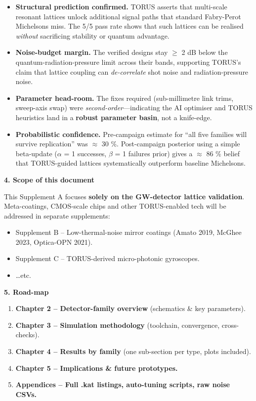 \documentclass[]{article}
\begin{document}
\begin{itemize}
\item
  \textbf{Structural prediction confirmed.} TORUS asserts that
  multi-scale resonant lattices unlock additional signal paths that
  standard Fabry-Perot Michelsons miss. The 5/5 pass rate shows that
  such lattices can be realised \emph{without} sacrificing stability or
  quantum advantage.
\item
  \textbf{Noise-budget margin.} The verified designs stay $\geq$ 2 dB below
  the quantum-radiation-pressure limit across their bands, supporting
  TORUS's claim that lattice coupling can \emph{de-correlate} shot noise
  and radiation-pressure noise.
\item
  \textbf{Parameter head-room.} The fixes required (sub-millimetre link
  trims, sweep-axis swap) were \emph{second-order}---indicating the AI
  optimiser and TORUS heuristics land in a \textbf{robust parameter
  basin}, not a knife-edge.
\item
  \textbf{Probabilistic confidence.} Pre-campaign estimate for ``all
  five families will survive replication'' was $\approx$ 30 \%. Post-campaign
  posterior using a simple beta-update ($\alpha$ = 1 successes, $\beta$ = 1 failures
  prior) gives a $\approx$ 86 \% belief that TORUS-guided lattices
  systematically outperform baseline Michelsons.
\end{itemize}

\textbf{4. Scope of this document}

This Supplement A focuses \textbf{solely on the GW-detector lattice
validation}. Meta-coatings, CMOS-scale chips and other TORUS-enabled
tech will be addressed in separate supplements:

\begin{itemize}
\item
  Supplement B -- Low-thermal-noise mirror coatings (Amato 2019, McGhee
  2023, Optica-OPN 2021).
\item
  Supplement C -- TORUS-derived micro-photonic gyroscopes.
\item
  \ldots{}etc.
\end{itemize}

\textbf{5. Road-map}

\begin{enumerate}
\def\labelenumi{\arabic{enumi}.}
\item
  \textbf{Chapter 2 -- Detector-family overview} (schematics \& key
  parameters).
\item
  \textbf{Chapter 3 -- Simulation methodology} (toolchain, convergence,
  cross-checks).
\item
  \textbf{Chapter 4 -- Results by family} (one sub-section per type,
  plots included).
\item
  \textbf{Chapter 5 -- Implications \& future prototypes.}
\item
  \textbf{Appendices -- Full .kat listings, auto-tuning scripts, raw
  noise CSVs.}
\end{enumerate}
\end{document}
